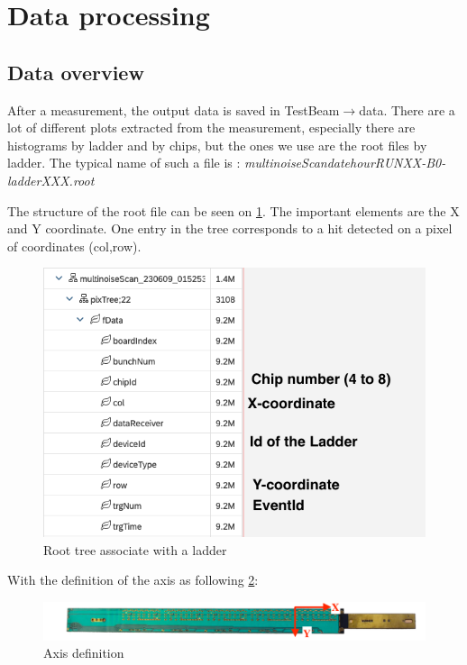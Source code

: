 \documentclass[12pt,oneside,a4]{article}
\begin{document}
\section{Data processing}
    \subsection{Data overview}\label{Data overview}
    After a measurement, the output data is saved in Test\textunderscore Beam$\rightarrow$data. 
    There are a lot of different plots extracted from the measurement, especially there are histograms by ladder and by chips, but the ones we use are the root files by ladder. The typical name of such a file is : \textit{multinoiseScan\textunderscore date\textunderscore hour\textunderscore RUNXX-B0-ladderXXX.root}
    
    The structure of the root file can be seen on \ref{fig:10}. The important elements are the X and Y coordinate. One entry in the tree corresponds to a hit detected on a pixel of coordinates (col,row).
    
\begin{figure}[h]
        \centering
        \includegraphics[scale =0.7]{figures/ROOT_file.png}
        \caption{Root tree associate with a ladder}
        \label{fig:10}
\end{figure}

With the definition of the axis as following \ref{fig:11}:

\begin{figure}[h]
        \centering
        \includegraphics[scale =0.7]{figures/Axis.png}
        \caption{Axis definition}
        \label{fig:11}
\end{figure}
\end{document}

